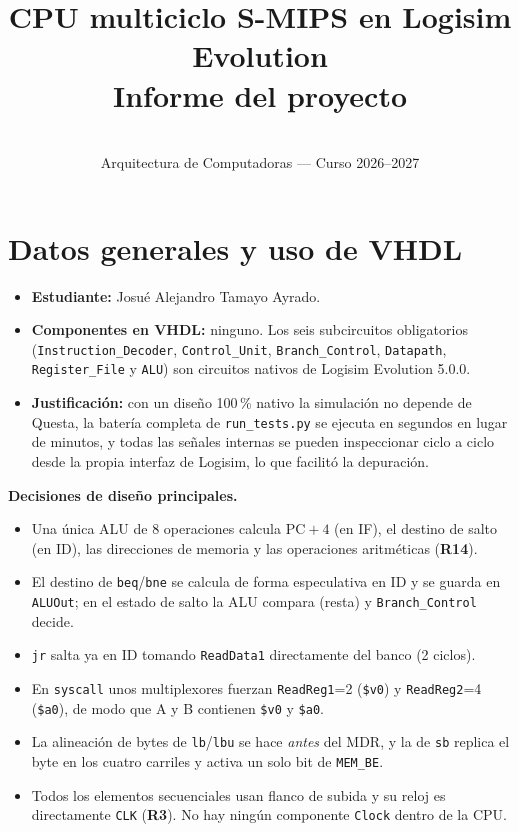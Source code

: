 \documentclass[10pt,a4paper]{article}
\title{CPU multiciclo S-MIPS en Logisim Evolution\\[2pt]\large Informe del proyecto}
\author{\estudiante\\\small Arquitectura de Computadoras --- Curso 2026--2027}
\date{}
\newcommand{\s}[1]{\texttt{#1}}
\newcommand{\estudiante}{Josué Alejandro Tamayo Ayrado}
\begin{document}
\maketitle

\section{Datos generales y uso de VHDL}

\begin{itemize}
\item \textbf{Estudiante:} \estudiante.
\sloppy
\item \textbf{Componentes en VHDL:} ninguno. Los seis subcircuitos obligatorios
(\s{Instruction\_Decoder}, \s{Control\_Unit}, \s{Branch\_Control}, \s{Datapath},
\s{Register\_File} y \s{ALU}) son circuitos nativos de Logisim Evolution 5.0.0.
\item \textbf{Justificación:} con un diseño 100\,\% nativo la simulación no depende de
Questa, la batería completa de \s{run\_tests.py} se ejecuta en segundos en lugar de
minutos, y todas las señales internas se pueden inspeccionar ciclo a ciclo desde la
propia interfaz de Logisim, lo que facilitó la depuración.
\end{itemize}

\noindent\textbf{Decisiones de diseño principales.}
\begin{itemize}
\item Una única ALU de 8 operaciones calcula $\mathrm{PC}+4$ (en IF), el destino de
salto (en ID), las direcciones de memoria y las operaciones aritméticas (\textbf{R14}).
\item El destino de \s{beq}/\s{bne} se calcula de forma especulativa en ID y se guarda
en \s{ALUOut}; en el estado de salto la ALU compara (resta) y \s{Branch\_Control} decide.
\item \s{jr} salta ya en ID tomando \s{ReadData1} directamente del banco (2 ciclos).
\item En \s{syscall} unos multiplexores fuerzan \s{ReadReg1}=2 (\s{\$v0}) y
\s{ReadReg2}=4 (\s{\$a0}), de modo que A y B contienen \s{\$v0} y \s{\$a0}.
\item La alineación de bytes de \s{lb}/\s{lbu} se hace \emph{antes} del MDR, y la de
\s{sb} replica el byte en los cuatro carriles y activa un solo bit de \s{MEM\_BE}.
\item Todos los elementos secuenciales usan flanco de subida y su reloj es directamente
\s{CLK} (\textbf{R3}). No hay ningún componente \s{Clock} dentro de la CPU.
\end{itemize}
\end{document}
